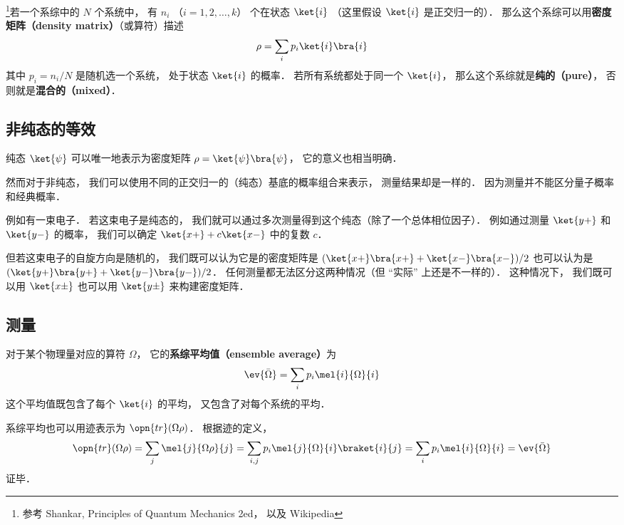 

\footnote{参考 Shankar, Principles of Quantum Mechanics 2ed， 以及 Wikipedia}若一个系综中的 $N$ 个系统中， 有 $n_i$ （$i = 1,2,\dots,k$） 个在状态 $\ket{i}$ （这里假设 $\ket{i}$ 是正交归一的）． 那么这个系综可以用\textbf{密度矩阵（density matrix）}（或算符）描述
\begin{equation}
\rho = \sum_i p_i\ket{i}\bra{i}   
\end{equation}
其中 $p_i = n_i/N$ 是随机选一个系统， 处于状态 $\ket{i}$ 的概率． 若所有系统都处于同一个 $\ket{i}$， 那么这个系综就是\textbf{纯的（pure）}， 否则就是\textbf{混合的（mixed）}．

\subsection{非纯态的等效}
纯态 $\ket{\psi}$ 可以唯一地表示为密度矩阵 $\rho = \ket{\psi}\bra{\psi}$， 它的意义也相当明确．

然而对于非纯态， 我们可以使用不同的正交归一的（纯态）基底的概率组合来表示， 测量结果却是一样的． 因为测量并不能区分量子概率和经典概率．

例如有一束电子． 若这束电子是纯态的， 我们就可以通过多次测量得到这个纯态（除了一个总体相位因子）． 例如通过测量 $\ket{y+}$ 和 $\ket{y-}$ 的概率， 我们可以确定 $\ket{x+} + c\ket{x-}$ 中的复数 $c$．

但若这束电子的自旋方向是随机的， 我们既可以认为它是的密度矩阵是 $(\ket{x+}\bra{x+} + \ket{x-}\bra{x-})/2$ 也可以认为是 $(\ket{y+}\bra{y+} + \ket{y-}\bra{y-})/2$． 任何测量都无法区分这两种情况（但 “实际” 上还是不一样的）． 这种情况下， 我们既可以用 $\ket{x\pm}$ 也可以用 $\ket{y\pm}$ 来构建密度矩阵．

\subsection{测量}
对于某个物理量对应的算符 $\Omega$， 它的\textbf{系综平均值（ensemble average）}为
\begin{equation}
\ev{\bar\Omega} = \sum_i p_i \mel{i}{\Omega}{i}
\end{equation}
这个平均值既包含了每个 $\ket{i}$ 的平均， 又包含了对每个系统的平均．

系综平均也可以用迹表示为 $\opn{tr}(\Omega\rho)$． 根据迹的定义，
\begin{equation}
\opn{tr}(\Omega\rho) = \sum_j \mel{j}{\Omega\rho}{j} = \sum_{i,j} p_i\mel{j}{\Omega}{i} \braket{i}{j} = \sum_{i} p_i\mel{i}{\Omega}{i} = \ev{\bar\Omega}
\end{equation}
证毕．

